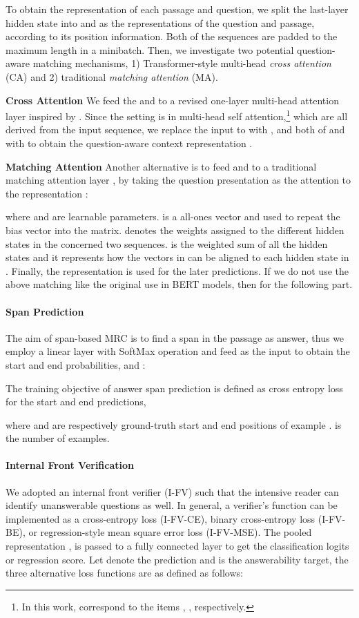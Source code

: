 \documentclass[letterpaper]{article} \usepackage{aaai21}  \usepackage{times}  \usepackage{helvet} \usepackage{courier}  \usepackage[hyphens]{url}  \usepackage{graphicx}
\begin{document}
To obtain the representation of each passage and question, we split the last-layer hidden state  into  and  as the representations of the question and passage, according to its position information. Both of the sequences are padded to the maximum length in a minibatch.  
Then, we investigate two potential question-aware matching mechanisms, 1) Transformer-style multi-head \textit{cross attention} (CA) and 2) traditional \textit{matching attention} (MA).

 \textbf{Cross Attention} 
We feed the  and  to a revised one-layer multi-head attention layer inspired by \citeauthor{lu2019vilbert} . Since the setting is  in multi-head self attention,\footnote{In this work,  correspond to the items , , respectively.} which are all derived from the input sequence, we replace the input to  with , and both of  and  with  to obtain the question-aware context representation .

 \textbf{Matching Attention}
Another alternative is to feed  and  to a traditional matching attention layer \cite{Wang2017Gated}, by taking the question presentation  as the attention to the representation :

	where  and  are learnable parameters.  is a all-ones vector and used to repeat the bias vector into the matrix.  denotes the weights assigned to the different hidden states in the concerned two sequences.  is the weighted sum of all the hidden states and it represents how the vectors in  can be aligned to each hidden state in . Finally, the representation  is used for the later predictions. If we do not use the above matching like the original use in BERT models, then  for the following part.

\paragraph{Span Prediction}
The aim of span-based MRC is to find a span in the passage as answer, thus we employ a linear layer with SoftMax operation and feed  as the input to obtain the start and end probabilities,  and :


The training objective of answer span prediction is defined as cross entropy loss for the start and end predictions, 

where  and  are respectively ground-truth start and end positions of example .  is the number of examples.


\paragraph{Internal Front Verification}\label{RV}
We adopted an internal front verifier (I-FV) such that the intensive reader can identify unanswerable questions as well. In general, a verifier's function can be implemented as  a cross-entropy loss (I-FV-CE), binary cross-entropy loss (I-FV-BE), or regression-style mean square error loss (I-FV-MSE). The pooled representation , is passed to a fully connected layer to get the classification logits or regression score.  Let  denote the prediction and  is the answerability target, the three alternative loss functions are as defined as follows:
\end{document}
